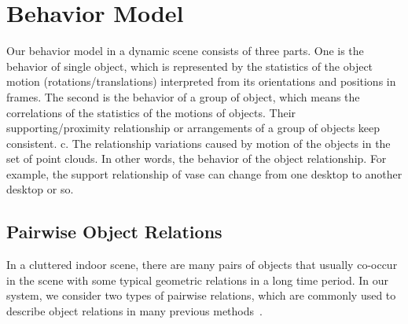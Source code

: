 \section{Behavior Model}
\label{sec:behavior}


Our behavior model in a dynamic scene consists of three parts. 
One is the behavior of single object, which is represented by the statistics of the object motion (rotations/translations) interpreted from its orientations and positions in frames.
%
The second is the behavior of a group of object, which means the correlations of the statistics of the motions of objects. Their supporting/proximity relationship or arrangements of a group of objects keep consistent. 
%
c. The relationship variations caused by motion of the objects in the set of point clouds. In other words, the behavior of the object relationship. For example, the support relationship of vase can change from one desktop to another desktop or so.  

\subsection{Pairwise Object Relations}
\label{sec:pairwise_relation}


In a cluttered indoor scene, there are many pairs of objects that usually co-occur in the scene with some typical geometric relations in a long time period. 
%
In our system, we consider two types of pairwise relations, which are commonly used to describe object relations in many previous methods~\cite{Fisherscenesynth12,Silberman:ECCV12,Xu13sig,xu_sig14}.


